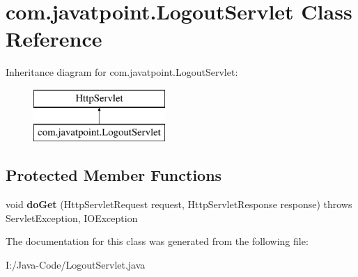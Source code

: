 \hypertarget{classcom_1_1javatpoint_1_1_logout_servlet}{}\section{com.\+javatpoint.\+Logout\+Servlet Class Reference}
\label{classcom_1_1javatpoint_1_1_logout_servlet}
Inheritance diagram for com.\+javatpoint.\+Logout\+Servlet\+:\begin{figure}[H]
\begin{center}
\leavevmode
\includegraphics[height=2.000000cm]{classcom_1_1javatpoint_1_1_logout_servlet}
\end{center}
\end{figure}
\subsection*{Protected Member Functions}
\begin{DoxyCompactItemize}
\item 
\mbox{\label{classcom_1_1javatpoint_1_1_logout_servlet_ae479322d520fd51d4e39453f933819ac}} 
void {\bfseries do\+Get} (Http\+Servlet\+Request request, Http\+Servlet\+Response response)  throws Servlet\+Exception, I\+O\+Exception 
\end{DoxyCompactItemize}


The documentation for this class was generated from the following file\+:\begin{DoxyCompactItemize}
\item 
I\+:/\+Java-\/\+Code/Logout\+Servlet.\+java\end{DoxyCompactItemize}
